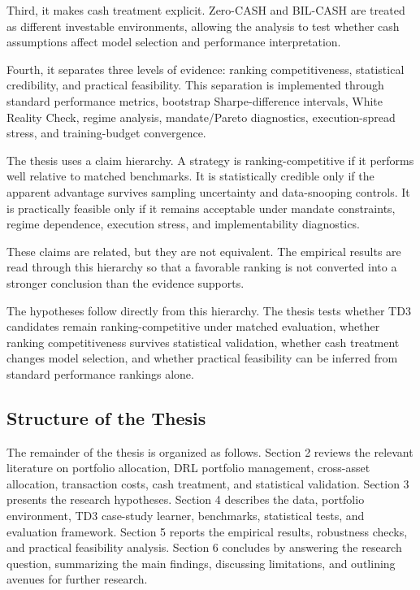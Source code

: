 \documentclass[12pt]{article}
\begin{document}
Third, it makes cash treatment explicit. Zero-CASH and BIL-CASH are treated as different investable environments, allowing the analysis to test whether cash assumptions affect model selection and performance interpretation.

Fourth, it separates three levels of evidence: ranking competitiveness, statistical credibility, and practical feasibility. This separation is implemented through standard performance metrics, bootstrap Sharpe-difference intervals, White Reality Check, regime analysis, mandate/Pareto diagnostics, execution-spread stress, and training-budget convergence.

The thesis uses a claim hierarchy. A strategy is ranking-competitive if it performs well relative to matched benchmarks. It is statistically credible only if the apparent advantage survives sampling uncertainty and data-snooping controls. It is practically feasible only if it remains acceptable under mandate constraints, regime dependence, execution stress, and implementability diagnostics.

These claims are related, but they are not equivalent. The empirical results are read through this hierarchy so that a favorable ranking is not converted into a stronger conclusion than the evidence supports.

The hypotheses follow directly from this hierarchy. The thesis tests whether TD3 candidates remain ranking-competitive under matched evaluation, whether ranking competitiveness survives statistical validation, whether cash treatment changes model selection, and whether practical feasibility can be inferred from standard performance rankings alone.

\subsection{Structure of the Thesis}

The remainder of the thesis is organized as follows. Section 2 reviews the relevant literature on portfolio allocation, DRL portfolio management, cross-asset allocation, transaction costs, cash treatment, and statistical validation. Section 3 presents the research hypotheses. Section 4 describes the data, portfolio environment, TD3 case-study learner, benchmarks, statistical tests, and evaluation framework. Section 5 reports the empirical results, robustness checks, and practical feasibility analysis. Section 6 concludes by answering the research question, summarizing the main findings, discussing limitations, and outlining avenues for further research.
\end{document}

